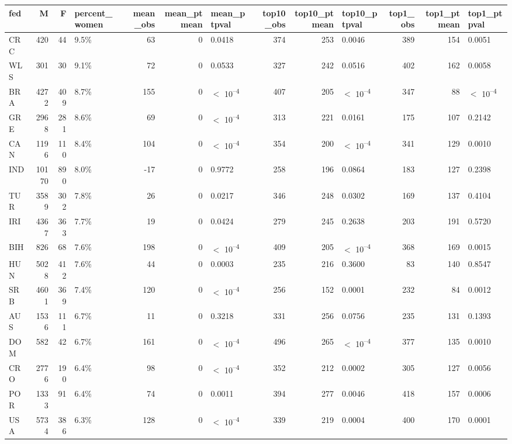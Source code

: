 
\begin{tabular}{l|r|r|l|r|r|l|r|r|l|r|r|l}
\hline
fed & M & F & percent_women & mean_obs & mean_ptmean & mean_ptpval & top10_obs & top10_ptmean & top10_ptpval & top1_obs & top1_ptmean & top1_ptpval\\
\hline
CRC & 420 & 44 & 9.5\% & 63 & 0 & 0.0418 & 374 & 253 & 0.0046 & 389 & 154 & 0.0051\\
\hline
WLS & 301 & 30 & 9.1\% & 72 & 0 & 0.0533 & 327 & 242 & 0.0516 & 402 & 162 & 0.0058\\
\hline
BRA & 4272 & 409 & 8.7\% & 155 & 0 & $<$ 10\textsuperscript{--4} & 407 & 205 & $<$ 10\textsuperscript{--4} & 347 & 88 & $<$ 10\textsuperscript{--4}\\
\hline
GRE & 2968 & 281 & 8.6\% & 69 & 0 & $<$ 10\textsuperscript{--4} & 313 & 221 & 0.0161 & 175 & 107 & 0.2142\\
\hline
CAN & 1196 & 110 & 8.4\% & 104 & 0 & $<$ 10\textsuperscript{--4} & 354 & 200 & $<$ 10\textsuperscript{--4} & 341 & 129 & 0.0010\\
\hline
IND & 10170 & 890 & 8.0\% & -17 & 0 & 0.9772 & 258 & 196 & 0.0864 & 183 & 127 & 0.2398\\
\hline
TUR & 3589 & 302 & 7.8\% & 26 & 0 & 0.0217 & 346 & 248 & 0.0302 & 169 & 137 & 0.4104\\
\hline
IRI & 4367 & 363 & 7.7\% & 19 & 0 & 0.0424 & 279 & 245 & 0.2638 & 203 & 191 & 0.5720\\
\hline
BIH & 826 & 68 & 7.6\% & 198 & 0 & $<$ 10\textsuperscript{--4} & 409 & 205 & $<$ 10\textsuperscript{--4} & 368 & 169 & 0.0015\\
\hline
HUN & 5028 & 412 & 7.6\% & 44 & 0 & 0.0003 & 235 & 216 & 0.3600 & 83 & 140 & 0.8547\\
\hline
SRB & 4601 & 369 & 7.4\% & 120 & 0 & $<$ 10\textsuperscript{--4} & 256 & 152 & 0.0001 & 232 & 84 & 0.0012\\
\hline
AUS & 1536 & 111 & 6.7\% & 11 & 0 & 0.3218 & 331 & 256 & 0.0756 & 235 & 131 & 0.1393\\
\hline
DOM & 582 & 42 & 6.7\% & 161 & 0 & $<$ 10\textsuperscript{--4} & 496 & 265 & $<$ 10\textsuperscript{--4} & 377 & 135 & 0.0010\\
\hline
CRO & 2776 & 190 & 6.4\% & 98 & 0 & $<$ 10\textsuperscript{--4} & 352 & 212 & 0.0002 & 305 & 127 & 0.0056\\
\hline
POR & 1333 & 91 & 6.4\% & 74 & 0 & 0.0011 & 394 & 277 & 0.0046 & 418 & 157 & 0.0006\\
\hline
USA & 5734 & 386 & 6.3\% & 128 & 0 & $<$ 10\textsuperscript{--4} & 339 & 219 & 0.0004 & 400 & 170 & 0.0001\\

\end{tabular}
